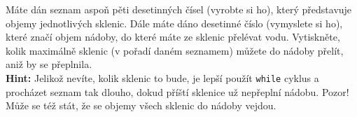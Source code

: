 \question[70]
Máte dán seznam aspoň pěti desetinných čísel (vyrobte si ho), který představuje
objemy jednotlivých sklenic. Dále máte dáno desetinné číslo (vymyslete si ho),
které značí objem nádoby, do které máte ze sklenic přelévat vodu. Vytiskněte,
kolik maximálně sklenic (v pořadí daném seznamem) můžete do nádoby přelít, aniž
by se přeplnila.\\
\textbf{Hint:} Jelikož nevíte, kolik sklenic to bude, je lepší použít
\texttt{while} cyklus a procházet seznam tak dlouho, dokud příští sklenice už
nepřeplní nádobu. Pozor! Může se též stát, že se objemy všech sklenic do nádoby vejdou.